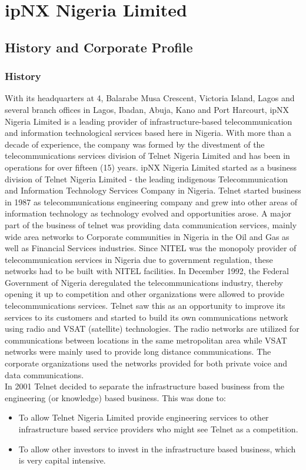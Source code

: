 \chapter{ipNX Nigeria Limited}

\section{History and Corporate Profile}
\subsection{History}
With its headquarters at 4, Balarabe Musa
Crescent, Victoria Island, Lagos and several branch offices in Lagos, Ibadan, Abuja, Kano and Port Harcourt, ipNX Nigeria Limited is a leading
provider of infrastructure-based telecommunication and information technological services based
here in Nigeria. With more than a decade of experience, the company was formed by the
divestment of the telecommunications services division of Telnet Nigeria Limited and has been in
operations for over fifteen (15) years.
ipNX Nigeria Limited started as a business division of Telnet Nigeria Limited - the leading
indigenous Telecommunication and Information Technology Services Company in Nigeria. Telnet
started business in 1987 as telecommunications engineering company and grew into other areas of
information technology as technology evolved and opportunities arose. A major part of the
business of telnet was providing data communication services, mainly wide area networks to
Corporate communities in Nigeria in the Oil and Gas as well as Financial Services industries. Since
NITEL was the monopoly provider of telecommunication services in Nigeria due to government
regulation, these networks had to be built with NITEL facilities.
In December 1992, the Federal Government of Nigeria deregulated the
telecommunications industry, thereby opening it up to competition and other organizations were
allowed to provide telecommunications services. Telnet saw this as an opportunity to improve its
services to its customers and started to build its own communications network using radio and
VSAT (satellite) technologies.
The radio networks are utilized for communications between locations in the same
metropolitan area while VSAT networks were mainly used to provide long distance communications. The corporate organizations used the networks provided for both private voice and data communications.\\

In 2001 Telnet decided to separate the infrastructure based business from the engineering
(or knowledge) based business. This was done to:
\begin{itemize}
	\item To allow Telnet Nigeria Limited provide engineering services to other infrastructure
	based service providers who might see Telnet as a competition.
	\item To allow other investors to invest in the infrastructure based business, which is very
	capital intensive.
\end{itemize}

